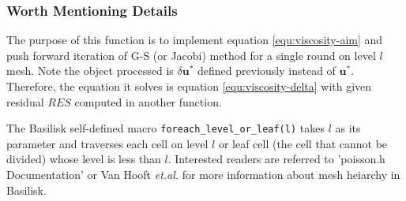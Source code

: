 \subsubsection{Worth Mentioning Details}
The purpose of this function is to implement equation \ref{equ:viscosity-aim} and push forward iteration of G-S (or Jacobi) method for a single round on level $l$ mesh. Note the object processed is $\delta \mathbf{u}^{*}$ defined previously instead of $ \mathbf{u}^{*}$. Therefore, the equation it solves is equation \ref{equ:viscosity-delta} with given residual $RES$ computed in another function.\par 
The Basilisk self-defined macro \texttt{foreach_level_or_leaf(l)} takes $l$ as its parameter and traverses each cell on level $l$ or leaf cell (the cell that cannot be divided) whose level is less than $l$. Interested readers are referred to 'poisson.h Documentation' or Van Hooft \emph{et.al.}\cite{2018_VanHooft} for more information about mesh heiarchy in Basilisk. 

